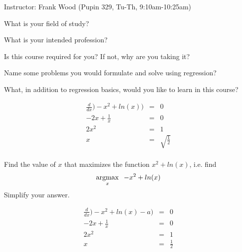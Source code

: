 \documentclass[12pt]{article}
\newcommand{\argmax}{\operatornamewithlimits{argmax}}
\begin{document}
 \begin{center}
  Instructor: Frank Wood (Pupin 329, Tu-Th,  9:10am-10:25am) 
 \end{center}
{}
\finishfirstpage



{
\abcs
\item
What is your field of study?  
\item 
What is your intended profession?  
\item
Is this course required for you?  If not, why are you taking it?
\item
Name some problems you would formulate and solve using regression?
\item
What, in addition to regression basics, would you like to learn in this course?
\endabcs
}
{
\vfill
\vspace{3cm}
}
{
\begin{eqnarray}
 \frac{d}{dx})-x^2 + ln(x) ) &=& 0 \\
 -2x+\frac{1}{x} &=& 0 \\
  2x^2 &=& 1 \\
  x &=& \sqrt{\frac{1}{2}} \\
\end{eqnarray}
}

{
Find the value of $x$ that maximizes the function $x^2+ln(x)$, i.e. find  \[\argmax_{x}  \;\;-x^2+ln(x)\]  Simplify your answer.
}
{
\vspace{3cm}

\vfill
  \answer
}
{
\begin{eqnarray}
 \frac{d}{dx})-x^2 + ln(x) -a) &=& 0 \\
 -2x+\frac{1}{x} &=& 0 \\
  2x^2 &=& 1 \\
  x &=& \frac{1}{2} \\
\end{eqnarray}
}
\end{document}
